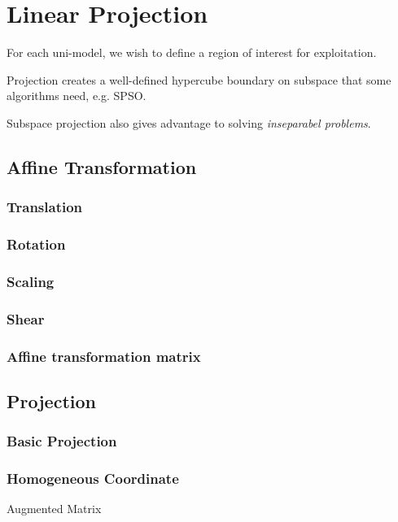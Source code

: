 \chapter{Linear Projection}
\label{chapter:projection}

For each uni-model, we wish to define a region of interest for exploitation.

Projection creates a well-defined hypercube boundary on subspace that some algorithms need, e.g. SPSO.

Subspace projection also gives advantage to solving \textit{inseparabel problems}.



\section{Affine Transformation}

\subsection{Translation}
\subsection{Rotation}
\subsection{Scaling}
\subsection{Shear}
\subsection{Affine transformation matrix}






\section{Projection}

\subsection{Basic Projection}


\subsection{Homogeneous Coordinate}
Augmented Matrix




